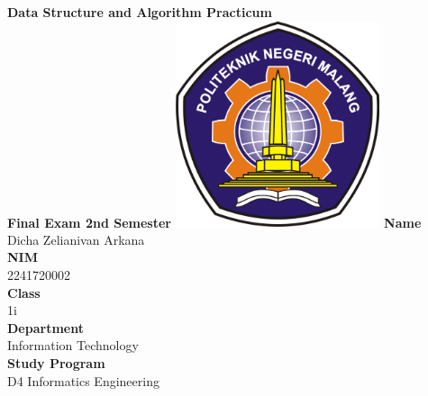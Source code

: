 \documentclass[12pt,titlepage]{article}
\newcommand{\vSubject}{Data Structure and Algorithm Practicum}
\newcommand{\vSubtitle}{Final Exam 2nd Semester}
\newcommand{\vName}{Dicha Zelianivan Arkana}
\newcommand{\vNIM}{2241720002}
\newcommand{\vClass}{1i}
\newcommand{\vDepartment}{Information Technology}
\newcommand{\vStudyProgram}{D4 Informatics Engineering}
\begin{document}
\begin{titlepage}
    \centering
    \vfill
    {\bfseries\LARGE
        \vSubject\\
        \vskip0.25cm
        \vSubtitle
    }
    \vfill
    \includegraphics[width=6cm]{images/polinema-logo.png}
    \vfill
    {
        \textbf{Name}\\
        \vName\\
        \vskip0.5cm
        \textbf{NIM}\\
        \vNIM\\
        \vskip0.5cm
        \textbf{Class}\\
        \vClass\\
        \vskip0.5cm
        \textbf{Department}\\
        \vDepartment\\
        \vskip0.5cm
        \textbf{Study Program}\\
        \vStudyProgram
    }
\end{titlepage}
\end{document}
